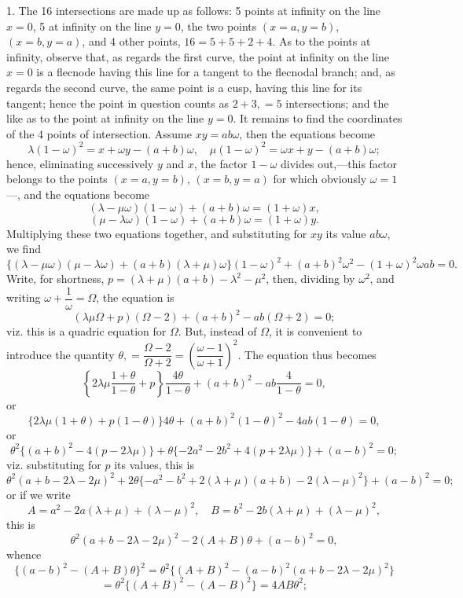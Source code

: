 \documentclass[10pt,twoside]{article}
\begin{document}
1. The 16 intersections are made up as follows: 5 points at infinity on the line \(x=0\), 5 at infinity on the line \(y=0\), the two points \((x=a,y=b)\), \((x=b,y=a)\), and 4 other points, \(16=5+5+2+4\). As to the points at infinity, observe that, as regards the first curve, the point at infinity on the line \(x=0\) is a flecnode having this line for a tangent to the flecnodal branch; and, as regards the second curve, the same point is a cusp, having this line for its tangent; hence the point in question counts as \(2+3,=5\) intersections; and the like as to the point at infinity on the line \(y=0\). It remains to find the coordinates of the 4 points of intersection. Assume \(xy=ab\omega\), then the equations become
\[
\lambda(1-\omega)^2=x+\omega y-(a+b)\omega,\quad
\mu(1-\omega)^2=\omega x+y-(a+b)\omega;
\]
hence, eliminating successively \(y\) and \(x\), the factor \(1-\omega\) divides out,---this factor belongs to the points \((x=a,y=b)\), \((x=b,y=a)\) for which obviously \(\omega=1\)---, and the equations become
\[
(\lambda-\mu\omega)(1-\omega)+(a+b)\omega=(1+\omega)x,
\]
\[
(\mu-\lambda\omega)(1-\omega)+(a+b)\omega=(1+\omega)y.
\]
Multiplying these two equations together, and substituting for \(xy\) its value \(ab\omega\), we find
\[
\{(\lambda-\mu\omega)(\mu-\lambda\omega)+(a+b)(\lambda+\mu)\omega\}(1-\omega)^2
+(a+b)^2\omega^2-(1+\omega)^2\omega ab=0.
\]
Write, for shortness, \(p=(\lambda+\mu)(a+b)-\lambda^2-\mu^2\), then, dividing by \(\omega^2\), and writing \(\omega+\dfrac{1}{\omega}=\Omega\), the equation is
\[
(\lambda\mu\Omega+p)(\Omega-2)+(a+b)^2-ab(\Omega+2)=0;
\]
viz. this is a quadric equation for \(\Omega\). But, instead of \(\Omega\), it is convenient to introduce the quantity \(\theta,=\dfrac{\Omega-2}{\Omega+2}=\left(\dfrac{\omega-1}{\omega+1}\right)^2\). The equation thus becomes
\[
\left\{2\lambda\mu\frac{1+\theta}{1-\theta}+p\right\}\frac{4\theta}{1-\theta}
+(a+b)^2-ab\frac{4}{1-\theta}=0,
\]
or
\[
\{2\lambda\mu(1+\theta)+p(1-\theta)\}4\theta
+(a+b)^2(1-\theta)^2-4ab(1-\theta)=0,
\]
or
\[
\theta^2\{(a+b)^2-4(p-2\lambda\mu)\}
+\theta\{-2a^2-2b^2+4(p+2\lambda\mu)\}+(a-b)^2=0;
\]
\newpage
\noindent viz. substituting for \(p\) its values, this is
\[
\theta^2(a+b-2\lambda-2\mu)^2
+2\theta\{-a^2-b^2+2(\lambda+\mu)(a+b)-2(\lambda-\mu)^2\}
+(a-b)^2=0;
\]
or if we write
\[
A=a^2-2a(\lambda+\mu)+(\lambda-\mu)^2,\quad
B=b^2-2b(\lambda+\mu)+(\lambda-\mu)^2,
\]
this is
\[
\theta^2(a+b-2\lambda-2\mu)^2-2(A+B)\theta+(a-b)^2=0,
\]
whence
\[
\{(a-b)^2-(A+B)\theta\}^2
=\theta^2\{(A+B)^2-(a-b)^2(a+b-2\lambda-2\mu)^2\}
\]
\[
=\theta^2\{(A+B)^2-(A-B)^2\}=4AB\theta^2;
\]
\end{document}
